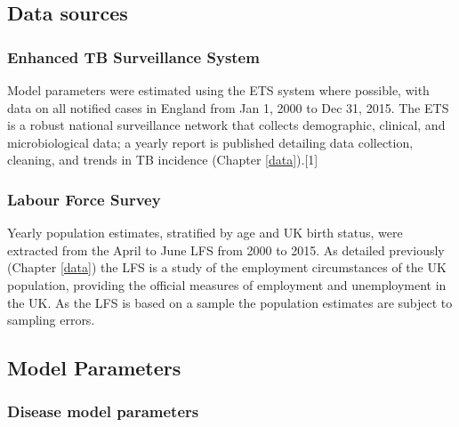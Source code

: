 \documentclass[11pt,twoside]{bristolthesis}
\begin{document}
  \hypertarget{data-sources-1}{%
  \subsection{Data sources}\label{data-sources-1}}
  
  \hypertarget{enhanced-tb-surveillance-system}{%
  \subsubsection{Enhanced TB Surveillance System}\label{enhanced-tb-surveillance-system}}
  
  Model parameters were estimated using the ETS system where possible, with data on all notified cases in England from Jan 1, 2000 to Dec 31, 2015. The ETS is a robust national surveillance network that collects demographic, clinical, and microbiological data; a yearly report is published detailing data collection, cleaning, and trends in TB incidence (Chapter \ref{data}).{[}1{]}
  
  \hypertarget{labour-force-survey}{%
  \subsubsection{Labour Force Survey}\label{labour-force-survey}}
  
  Yearly population estimates, stratified by age and UK birth status, were extracted from the April to June LFS from 2000 to 2015. As detailed previously (Chapter \ref{data}) the LFS is a study of the employment circumstances of the UK population, providing the official measures of employment and unemployment in the UK. As the LFS is based on a sample the population estimates are subject to sampling errors.
  
  \hypertarget{model-parameters}{%
  \subsection{Model Parameters}\label{model-parameters}}
  
  \hypertarget{disease-model-parameters}{%
  \subsubsection{Disease model parameters}\label{disease-model-parameters}}
  
\end{document}
